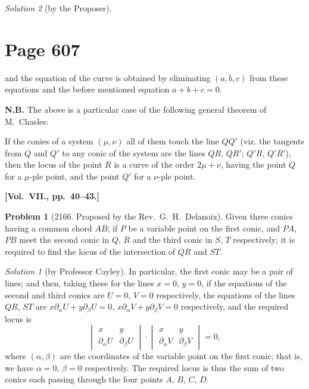 \documentclass[12pt,a4paper]{article}
\theoremstyle{plain}
\theoremstyle{definition}
\newtheorem{problem}{Problem}
\theoremstyle{remark}
\newtheorem*{solution}{Solution}
\begin{document}
\begin{solution}[by the Proposer]
\section*{Page 607}
\setcounter{page}{607}

and the equation of the curve is obtained by eliminating $(a, b, c)$ from these equations and the before mentioned equation $a + b + c = 0$.

\medskip\noindent\textbf{N.B.} The above is a particular case of the following general theorem of M.~Chasles:

If the conies of a system $(\mu, \nu)$ all of them touch the line $QQ'$ (viz. the tangents from $Q$ and $Q'$ to any conic of the system are the lines $QR$, $QR'$; $Q'R$, $Q'R'$), then the locus of the point $R$ is a curve of the order $2\mu + \nu$, having the point $Q$ for a $\mu$-ple point, and the point $Q'$ for a $\nu$-ple point.

\medskip\noindent\textbf{[Vol.~VII., pp.~40--43.]}

\begin{problem}[2166. Proposed by the Rev.~G.~H.~Delanoix]
Given three conics having a common chord $AB$; if $P$ be a variable point on the first conic, and $PA$, $PB$ meet the second conic in $Q$, $R$ and the third conic in $S$, $T$ respectively; it is required to find the locus of the intersection of $QR$ and $ST$.
\end{problem}

\begin{solution}[by Professor Cayley]
In particular, the first conic may be a pair of lines; and then, taking these for the lines $x = 0$, $y = 0$, if the equations of the second and third conics are $U = 0$, $V = 0$ respectively, the equations of the lines $QR$, $ST$ are $x\partial_\alpha U + y\partial_\beta U = 0$, $x\partial_\alpha V + y\partial_\beta V = 0$ respectively, and the required locus is
\[
\begin{vmatrix}
x & y \\
\partial_\alpha U & \partial_\beta U
\end{vmatrix}
\cdot
\begin{vmatrix}
x & y \\
\partial_\alpha V & \partial_\beta V
\end{vmatrix} = 0,
\]
where $(\alpha, \beta)$ are the coordinates of the variable point on the first conic; that is, we have $\alpha = 0$, $\beta = 0$ respectively. The required locus is thus the sum of two conics each passing through the four points $A$, $B$, $C$, $D$.
\end{solution}


\end{solution}
\end{document}
